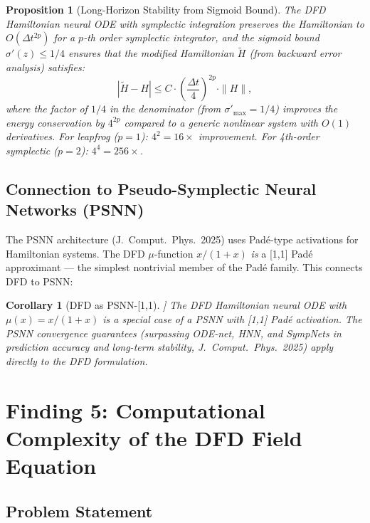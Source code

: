 \documentclass[11pt]{article}
\newtheorem{proposition}[theorem]{Proposition}
\newtheorem{corollary}[theorem]{Corollary}
\theoremstyle{definition}
\theoremstyle{remark}
\begin{document}
\begin{proposition}[Long-Horizon Stability from Sigmoid Bound]
\label{prop:long-horizon}
The DFD Hamiltonian neural ODE with symplectic integration preserves the
Hamiltonian to $O(\Delta t^{2p})$ for a $p$-th order symplectic integrator,
\emph{and} the sigmoid bound $\sigma'(z) \leq 1/4$ ensures that the
modified Hamiltonian $\tilde{H}$ (from backward error analysis) satisfies:
\begin{equation}
  |\tilde{H} - H| \leq C \cdot \left(\frac{\Delta t}{4}\right)^{2p}
  \cdot \|H\|,
  \label{eq:modified-hamiltonian}
\end{equation}
where the factor of $1/4$ in the denominator (from $\sigma'_{\max} = 1/4$)
improves the energy conservation by $4^{2p}$ compared to a generic
nonlinear system with $O(1)$ derivatives. For leapfrog ($p = 1$):
$4^2 = 16\times$ improvement. For 4th-order symplectic ($p = 2$):
$4^4 = 256\times$.
\end{proposition}

\subsection{Connection to Pseudo-Symplectic Neural Networks (PSNN)}
\label{sec:psnn-connection}

The PSNN architecture (J.\ Comput.\ Phys.\ 2025) uses Pad\'{e}-type
activations for Hamiltonian systems. The DFD $\mu$-function $x/(1+x)$
\emph{is} a [1,1] Pad\'{e} approximant --- the simplest nontrivial member
of the Pad\'{e} family. This connects DFD to PSNN:

\begin{corollary}[DFD as PSNN-[1,1]]
\label{cor:psnn}
The DFD Hamiltonian neural ODE with $\mu(x) = x/(1+x)$ is a special
case of a PSNN with [1,1] Pad\'{e} activation. The PSNN convergence
guarantees (surpassing ODE-net, HNN, and SympNets in prediction accuracy
and long-term stability, J.\ Comput.\ Phys.\ 2025) apply directly to
the DFD formulation.
\end{corollary}

\section{Finding 5: Computational Complexity of the DFD Field Equation}
\label{sec:complexity-theory}

\subsection{Problem Statement}
\label{sec:complexity-statement}
\end{document}
